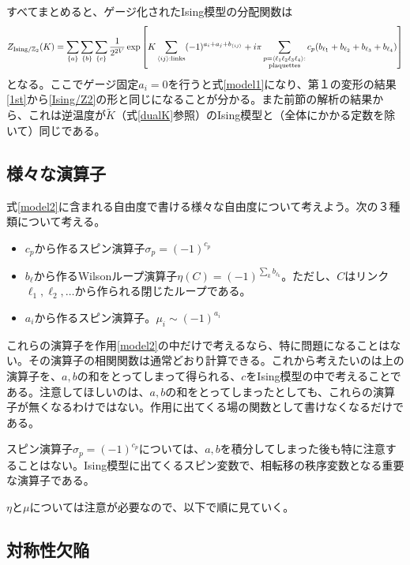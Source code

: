\documentclass[a4paper,12pt,dvipdfmx]{jlreq}
\newcommand{\Kt}{\widetilde{K}}
\newcommand{\ZGIs}{Z_{\mathrm{Ising}/\mathbb{Z}_2}}
\begin{document}
すべてまとめると、ゲージ化されたIsing模型の分配関数は
\begin{align}
  \ZGIs(K)=\sum_{\{a\}}\sum_{\{b\}}\sum_{\{c\}}\frac{1}{2^{2V}} \exp\left[
    K\sum_{\expval{ij}:\text{links}}(-1)^{a_i+a_j+b_{\expval{ij}}}+i\pi\sum_{\substack{p=\expval{\ell_1 \ell_2 \ell_3 \ell_4}:\\ \text{plaquettes}}} c_{p}(b_{\ell_1}+b_{\ell_2}+b_{\ell_3}+b_{\ell_4})
  \right]
  \label{model2}
\end{align}
となる。ここでゲージ固定$a_{i}=0$を行うと式\eqref{model1}になり、第１の変形の結果\eqref{1st}から\eqref{Ising/Z2}の形と同じになることが分かる。また前節の解析の結果から、これは逆温度が$\Kt$（式\eqref{dualK}参照）のIsing模型と（全体にかかる定数を除いて）同じである。

\subsection{様々な演算子}
式\eqref{model2}に含まれる自由度で書ける様々な自由度について考えよう。次の３種類について考える。
\begin{itemize}
  \item $c_p$から作るスピン演算子$\sigma_{p}=(-1)^{c_p}$
  \item $b_{\ell}$から作るWilsonループ演算子$\eta(C)=(-1)^{\sum_{k}b_{\ell_k}}$。ただし、$C$はリンク$\ell_1,\ell_2,\dots$から作られる閉じたループである。
  \item $a_i$から作るスピン演算子。$\mu_{i}\sim (-1)^{a_i}$
\end{itemize}

これらの演算子を作用\eqref{model2}の中だけで考えるなら、特に問題になることはない。その演算子の相関関数は通常どおり計算できる。これから考えたいのは上の演算子を、$a,b$の和をとってしまって得られる、$c$をIsing模型の中で考えることである。注意してほしいのは、$a,b$の和をとってしまったとしても、これらの演算子が無くなるわけではない。作用に出てくる場の関数として書けなくなるだけである。

スピン演算子$\sigma_{p}=(-1)^{c_p}$については、$a,b$を積分してしまった後も特に注意することはない。Ising模型に出てくるスピン変数で、相転移の秩序変数となる重要な演算子である。

$\eta$と$\mu$については注意が必要なので、以下で順に見ていく。


\subsection{対称性欠陥}
\end{document}
